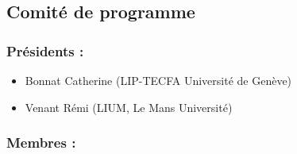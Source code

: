 \subsection*{Comité de programme}


\subsubsection*{Présidents :}

\begin{itemize}
	\item[] Bonnat Catherine (LIP-TECFA Université de Genève)
	\item[] Venant Rémi (LIUM, Le Mans Université)
\end{itemize}

\subsubsection*{Membres :}


